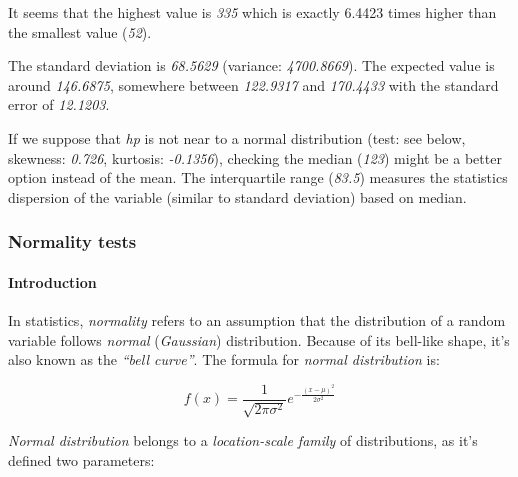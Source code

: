 \documentclass[]{article}
\begin{document}
It seems that the highest value is \emph{335} which is exactly 6.4423
times higher than the smallest value (\emph{52}).

The standard deviation is \emph{68.5629} (variance: \emph{4700.8669}).
The expected value is around \emph{146.6875}, somewhere between
\emph{122.9317} and \emph{170.4433} with the standard error of
\emph{12.1203}.

If we suppose that \emph{hp} is not near to a normal distribution (test:
see below, skewness: \emph{0.726}, kurtosis: \emph{-0.1356}), checking
the median (\emph{123}) might be a better option instead of the mean.
The interquartile range (\emph{83.5}) measures the statistics dispersion
of the variable (similar to standard deviation) based on median.

\subsubsection{Normality tests}

\paragraph{Introduction}

In statistics, \emph{normality} refers to an assumption that the
distribution of a random variable follows \emph{normal}
(\emph{Gaussian}) distribution. Because of its bell-like shape, it's
also known as the \emph{``bell curve''}. The formula for \emph{normal
distribution} is:

\[f(x) = \frac{1}{\sqrt{2\pi{}\sigma{}^2}} e^{-\frac{(x-\mu{})^2}{2\sigma{}^2}}\]

\emph{Normal distribution} belongs to a \emph{location-scale family} of
distributions, as it's defined two parameters:
\end{document}
